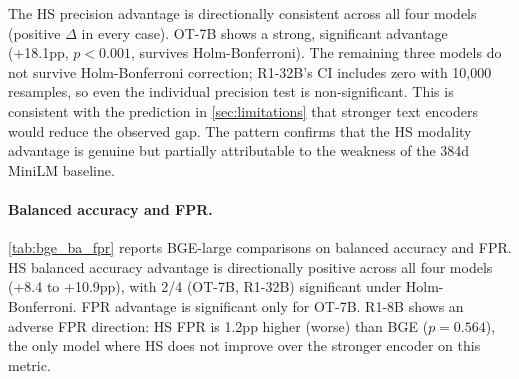 \begin{table}[htbp]
\centering
\small
\caption{HS vs.\ BGE-large (1024d) text probe precision. $\Delta$: HS minus BGE-large. Bootstrap: 10{,}000 resamples, two-sided null-centered. HB: survives Holm-Bonferroni correction (4 tests, $\alpha{=}0.05$).}
\label{tab:encoder_robustness}
\end{table}


The HS precision advantage is directionally consistent across all four models (positive $\Delta$ in every case). OT-7B shows a strong, significant advantage (+18.1pp, $p{<}0.001$, survives Holm-Bonferroni). The remaining three models do not survive Holm-Bonferroni correction; R1-32B's CI includes zero with 10{,}000 resamples, so even the individual precision test is non-significant. This is consistent with the prediction in \cref{sec:limitations} that stronger text encoders would reduce the observed gap. The pattern confirms that the HS modality advantage is genuine but partially attributable to the weakness of the 384d MiniLM baseline.

\paragraph{Balanced accuracy and FPR.} \cref{tab:bge_ba_fpr} reports BGE-large comparisons on balanced accuracy and FPR. HS balanced accuracy advantage is directionally positive across all four models (+8.4 to +10.9pp), with 2/4 (OT-7B, R1-32B) significant under Holm-Bonferroni. FPR advantage is significant only for OT-7B. R1-8B shows an adverse FPR direction: HS FPR is 1.2pp higher (worse) than BGE ($p{=}0.564$), the only model where HS does not improve over the stronger encoder on this metric.

